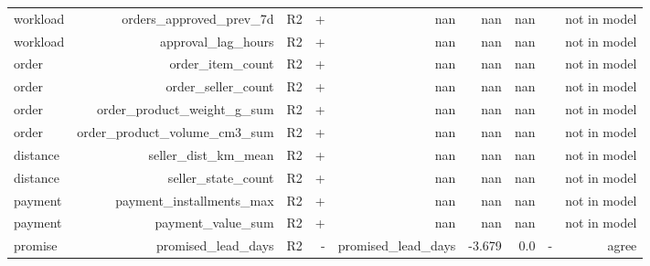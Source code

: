 \begin{table}[htbp]
\begin{tabular}{lrrrrrrrr}
workload & orders\_approved\_prev\_7d & R2 & + & nan & nan & nan &  & not in model \\
workload & approval\_lag\_hours & R2 & + & nan & nan & nan &  & not in model \\
order & order\_item\_count & R2 & + & nan & nan & nan &  & not in model \\
order & order\_seller\_count & R2 & + & nan & nan & nan &  & not in model \\
order & order\_product\_weight\_g\_sum & R2 & + & nan & nan & nan &  & not in model \\
order & order\_product\_volume\_cm3\_sum & R2 & + & nan & nan & nan &  & not in model \\
distance & seller\_dist\_km\_mean & R2 & + & nan & nan & nan &  & not in model \\
distance & seller\_state\_count & R2 & + & nan & nan & nan &  & not in model \\
payment & payment\_installments\_max & R2 & + & nan & nan & nan &  & not in model \\
payment & payment\_value\_sum & R2 & + & nan & nan & nan &  & not in model \\
promise & promised\_lead\_days & R2 & - & promised\_lead\_days & -3.679 & 0.0 & - & agree \\
\bottomrule
\end{tabular}
\par\smallskip\begin{minipage}{\linewidth}\footnotesize \end{minipage}
\end{table}

